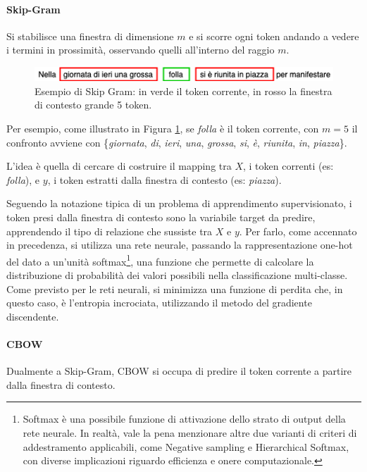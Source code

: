 \documentclass[12pt]{report}
\theoremstyle{definition}
\begin{document}
\paragraph{Skip-Gram}
Si stabilisce una finestra di dimensione $m$ e si scorre ogni token andando a vedere i termini in prossimità, osservando quelli all'interno del raggio $m$.
\begin{figure}
    \centering
    \includegraphics[scale = 0.7]{images/skip-gram.png}
    \caption{Esempio di Skip Gram: in verde il token corrente, in rosso la finestra di contesto grande 5 token.}
    \label{skipgram}
\end{figure}
Per esempio, come illustrato in Figura \ref{skipgram}, se \textit{folla} è il token corrente, con $m = 5$ il confronto avviene con \{\textit{giornata}, \textit{di}, \textit{ieri}, \textit{una}, \textit{grossa}, \textit{si}, \textit{è}, \textit{riunita}, \textit{in}, \textit{piazza}\}.

L'idea è quella di cercare di costruire il mapping tra $X$, i token correnti (es: \textit{folla}), e $y$, i token estratti dalla finestra di contesto (es: \textit{piazza}).

Seguendo la notazione tipica di un problema di apprendimento supervisionato, i token presi dalla finestra di contesto sono la variabile target da predire, apprendendo il tipo di relazione che sussiste tra  $X$ e $y$.
Per farlo, come accennato in precedenza, si utilizza una rete neurale, passando la rappresentazione one-hot del dato a un'unità softmax\footnote{Softmax è una possibile funzione di attivazione dello strato di output della rete neurale. In realtà, vale la pena menzionare altre due varianti di criteri di addestramento applicabili, come Negative sampling e Hierarchical Softmax, con diverse implicazioni riguardo efficienza e onere computazionale.}, una funzione che permette di calcolare la distribuzione di probabilità dei valori possibili nella classificazione multi-classe. Come previsto per le reti neurali, si minimizza una funzione di perdita che, in questo caso, è l'entropia incrociata, utilizzando il metodo del gradiente discendente. 

\paragraph{CBOW}
Dualmente a Skip-Gram, CBOW si occupa di predire il token corrente a partire dalla finestra di contesto.
\end{document}
